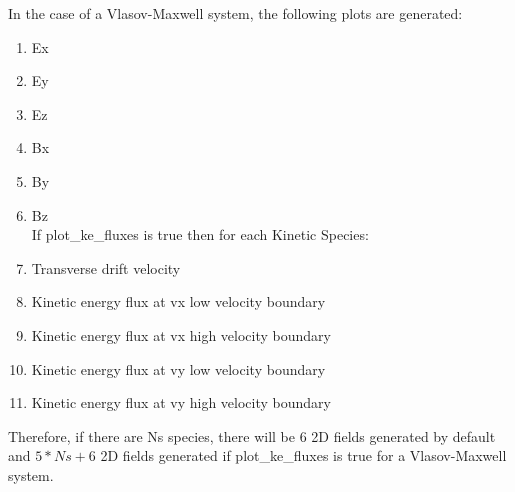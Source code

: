 \documentclass[11pt]{amsart}
\begin{document}
In the case of a Vlasov-Maxwell system, the following plots are generated:
\begin{enumerate}
\item Ex
\item Ey
\item Ez
\item Bx
\item By
\item Bz \\
If plot\_ke\_fluxes is true then for each Kinetic Species:
\item Transverse drift velocity
\item Kinetic energy flux at vx low velocity boundary
\item Kinetic energy flux at vx high velocity boundary
\item Kinetic energy flux at vy low velocity boundary
\item Kinetic energy flux at vy high velocity boundary
\end{enumerate}
Therefore, if there are Ns species, there will be $6$ 2D fields generated by
default and $5*Ns+6$ 2D fields generated if plot\_ke\_fluxes is true for a
Vlasov-Maxwell system.
\end{document}
